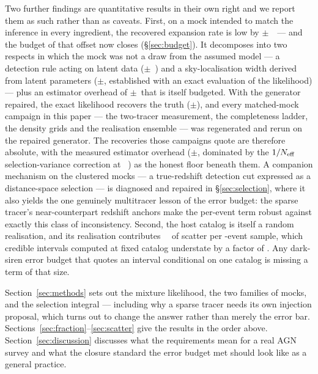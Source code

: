 Two further findings are quantitative results in their own right and we report
them as such rather than as caveats. First, on a mock intended to match the
inference in every ingredient, the recovered expansion rate is low by
\AbCtrlMeanAbs$\pm$\AbCtrlSem~\kmsmpc\ --- and the budget of that offset now
closes (\S\ref{sec:budget}). It decomposes into two respects in which the mock
was not a draw from the assumed model --- a detection rule acting on latent
data (\AbDiffMean$\pm$\AbDiffSem~\kmsmpc) and a sky-localisation width derived
from latent parameters (\OrcExactOff$\pm$\OrcExactSem, established with an
exact evaluation of the likelihood) --- plus an estimator overhead of
\OrcPairedOff$\pm$\OrcPairedSem\ that is itself budgeted. With the generator
repaired, the exact likelihood recovers the truth
(\OrcBootFixOff$\pm$\OrcBootFixSem), and every matched-mock campaign in this
paper --- the two-tracer measurement, the completeness ladder, the density
grids and the realisation ensemble --- was regenerated and rerun on the
repaired generator. The recoveries those campaigns quote are therefore
absolute, with the measured estimator overhead
(\OrcPairedOff$\pm$\OrcPairedSem, dominated by the $1/N_{\rm eff}$
selection-variance correction at \OrcFarr~\kmsmpc) as the honest floor
beneath them. A companion mechanism on the clustered
mocks --- a true-redshift detection cut expressed as a distance-space
selection --- is diagnosed and repaired in \S\ref{sec:selection}, where it
also yields the one genuinely multitracer lesson of the error budget: the
sparse tracer's near-counterpart redshift anchors make the per-event term
robust against exactly this class of inconsistency. Second,
the host catalog is itself a random realisation, and its realisation
contributes \CloCatalogVariance~\kmsmpc\ of scatter per \GlassNobs-event
sample, which credible intervals computed at fixed catalog understate by a
factor of \CloSeedUnderFactor. Any dark-siren error budget that quotes an
interval conditional on one catalog is missing a term of that size.

Section~\ref{sec:methods} sets out the mixture likelihood, the two families of
mocks, and the selection integral --- including why a sparse tracer needs its
own injection proposal, which turns out to change the answer rather than merely
the error bar. Sections~\ref{sec:fraction}--\ref{sec:scatter} give the results
in the order above. Section~\ref{sec:discussion} discusses what the
requirements mean for a real AGN survey and what the closure standard the
error budget met should look like as a general practice.
